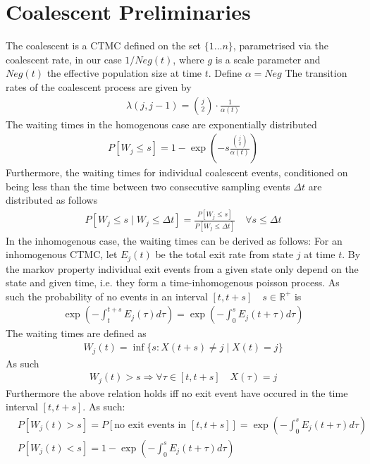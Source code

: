 \documentclass{report}
\newcommand{\R}{\mathbb{R}}
\theoremstyle{definition}
\begin{document}
\section{Coalescent Preliminaries}
The coalescent is a CTMC defined on the set $\{1 ... n\}$, parametrised via the coalescent rate, in our case $1/Neg(t)$, where $g$ is a scale parameter and $Neg(t)$ the effective population size at time $t$. Define $\alpha = Neg$
The transition rates of the coalescent process are given by 
\begin{gather*}
\lambda(j, j-1) = \binom{j}{2}\cdot\frac{1}{\alpha(t)}
\end{gather*}
The waiting times in the homogenous case are exponentially distributed
\begin{gather*}
P[W_j \leq s] = 1-\exp(-s\frac{\binom{j}{2}}{\alpha(t)})
\end{gather*}
Furthermore, the waiting times for individual coalescent events, conditioned on being less than the time between two consecutive sampling events $\Delta t$ are distributed as follows
\begin{gather}\label{eq:conditional}
P[W_j \leq s\mid W_j \leq \Delta t ] = \frac{P[W_j \leq s]}{P[W_j \leq \Delta t]} \quad\forall s \leq \Delta t
\end{gather}
In the inhomogenous case, the waiting times can be derived as follows:
For an inhomogenous CTMC, let $E_j(t)$ be the total exit rate from state $j$ at time $t$.
By the markov property individual exit events from a given state only depend on the state and given time, i.e. they form a time-inhomogenous poisson process.
As such the probability of no events in an interval $[t,t+s]\quad s\in \R^+$ is 
\begin{gather}
\exp(-\int_t^{t+s}E_j(\tau)d\tau) = \exp(-\int_0^{s}E_j(t+\tau)d\tau)
\end{gather}
The waiting times are defined as
\begin{gather}
W_j(t) = \inf\{s:X(t+s)\neq j \mid X(t) = j\}
\end{gather}
As such
\begin{gather}
W_j(t) > s \Rightarrow \forall \tau\in[t, t+s]\quad X(\tau) = j
\end{gather}
Furthermore the above relation holds iff no exit event have occured in the time interval $[t,t+s]$. As such:
\begin{align*}
&P[W_j(t) > s] = P[\text{no exit events in }[t,t+s]] = \exp(-\int_0^{s}E_j(t+\tau)d\tau)\\
&P[W_j(t) < s] = 1 - \exp(-\int_0^{s}E_j(t+\tau)d\tau)
\end{align*}
\end{document}

